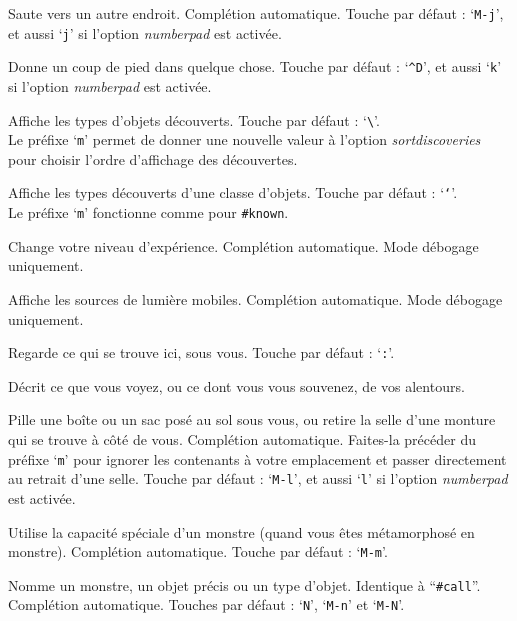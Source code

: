 \documentclass[titlepage]{article}
\begin{document}
\begin{description}[font=\mdseries\ttfamily]
\item[\#jump]
Saute vers un autre endroit. Complétion automatique.
Touche par défaut : `\texttt{M-j}',
et aussi `\texttt{j}' si l'option \textit{number\textunderscore pad} est activée.
\item[\#kick]
Donne un coup de pied dans quelque chose.
Touche par défaut : `\texttt{\textasciicircum D}',
et aussi `\texttt{k}' si l'option \textit{number\textunderscore pad} est activée.
\item[\#known]
Affiche les types d'objets découverts.
Touche par défaut : `\texttt{\textbackslash}'.
\\
Le préfixe `\texttt{m}' permet de donner une nouvelle valeur à l'option
\textit{sortdiscoveries}
pour choisir l'ordre d'affichage des découvertes.
\item[\#knownclass]
Affiche les types découverts d'une classe d'objets.
Touche par défaut : `\texttt{`}'.
\\
Le préfixe `\texttt{m}' fonctionne comme pour \texttt{\#known}.
\item[\#levelchange]
Change votre niveau d'expérience.
Complétion automatique.
Mode débogage uniquement.
\item[\#lightsources]
Affiche les sources de lumière mobiles.
Complétion automatique.
Mode débogage uniquement.
\item[\#look]
Regarde ce qui se trouve ici, sous vous. Touche par défaut : `\texttt{:}'.
\item[\#lookaround]
Décrit ce que vous voyez, ou ce dont vous vous souvenez, de vos alentours.
\item[\#loot]
Pille une boîte ou un sac posé au sol sous vous, ou retire la selle
d'une monture qui se trouve à côté de vous. Complétion automatique.
Faites-la précéder du préfixe `\texttt{m}' pour ignorer les contenants à votre emplacement
et passer directement au retrait d'une selle.
Touche par défaut : `\texttt{M-l}',
et aussi `\texttt{l}' si l'option \textit{number\textunderscore pad} est activée.
\item[\#monster]
Utilise la capacité spéciale d'un monstre (quand vous êtes métamorphosé en monstre).
Complétion automatique. Touche par défaut : `\texttt{M-m}'.
\item[\#name]
Nomme un monstre, un objet précis ou un type d'objet.
Identique à ``\texttt{\#call}''.
Complétion automatique.
Touches par défaut : `\texttt{N}', `\texttt{M-n}' et `\texttt{M-N}'.
\item[\#offer]

\end{description}
\end{document}
